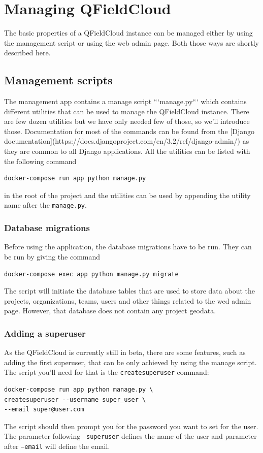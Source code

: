 \documentclass{article}
\begin{document}
\section{Managing QFieldCloud}
The basic properties of a QFieldCloud instance can be managed either by using the management script or using the web admin page. Both those ways are shortly described here. 

\subsection{Management scripts}
\begin{markdown}
The management app contains a manage script ```manage.py``` which contains different utilities that can be used to manage the QFieldCloud instance. There are few dozen utilities but we have only needed few of those, so we'll introduce those. Documentation for most of the commands can be found from the [Django documentation](https://docs.djangoproject.com/en/3.2/ref/django-admin/) as they are common to all Django applications. All the utilities can be listed with the following command
\end{markdown}
\begin{verbatim}
docker-compose run app python manage.py 
\end{verbatim}
in the root of the project and the utilities can be used by appending the utility name after the \texttt{manage.py}.

\subsubsection{Database migrations}
Before using the application, the database migrations have to be run. They can be run by giving the command
\begin{verbatim}
docker-compose exec app python manage.py migrate
\end{verbatim}
The script will initiate the database tables that are used to store data about the projects, organizations, teams, users and other things related to the wed admin page. However, that database does not contain any project geodata.

\subsubsection{Adding a superuser}
As the QFieldCloud is currently still in beta, there are some features, such as adding the first superuser, that can be only achieved by using the manage script. The script you'll need for that is the \texttt{createsuperuser} command:
\begin{verbatim}
docker-compose run app python manage.py \ 
createsuperuser --username super_user \ 
--email super@user.com
\end{verbatim}
The script should then prompt you for the password you want to set for the user. The parameter following \texttt{--superuser} defines the name of the user and parameter after \texttt{--email} will define the email.
\end{document}
